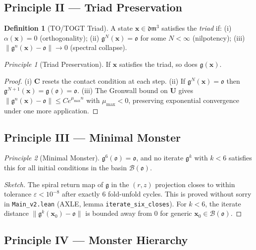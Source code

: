 \documentclass[12pt,a4paper]{amsart}
\theoremstyle{definition}
\newtheorem{definition}[theorem]{Definition}
\theoremstyle{remark}
\newtheorem{principle}{Principle}
\newcommand{\Cop}{\mathbf{C}}
\newcommand{\Uop}{\mathbf{U}}
\newcommand{\GG}{\mathfrak{g}}
\newcommand{\dm}{\mathfrak{dm}^3}
\newcommand{\ocio}{\mathfrak{o}}
\begin{document}
\subsection{Principle II --- Triad Preservation}

\begin{definition}[TO/TOGT Triad]
A state $\mathbf{x} \in \dm$ satisfies the \emph{triad} if:
(i) $\alpha(\mathbf{x}) = 0$ (orthogonality);
(ii) $\GG^N(\mathbf{x}) = \ocio$ for some $N < \infty$ (nilpotency);
(iii) $\|\GG^n(\mathbf{x}) - \ocio\| \to 0$ (spectral collapse).
\end{definition}

\begin{principle}[Triad Preservation]
If $\mathbf{x}$ satisfies the triad, so does $\GG(\mathbf{x})$.
\end{principle}
\begin{proof}
(i) $\Cop$ resets the contact condition at each step.
(ii) If $\GG^N(\mathbf{x})=\ocio$ then $\GG^{N+1}(\mathbf{x})=\GG(\ocio)=\ocio$.
(iii) The Gronwall bound on $\Uop$ gives $\|\GG^n(\mathbf{x})-\ocio\| \leq Ce^{\mu_{\max}n}$
with $\mu_{\max} < 0$, preserving exponential convergence under one more application.
\end{proof}

\subsection{Principle III --- Minimal Monster}

\begin{principle}[Minimal Monster]\label{prin:minimal}
$\GG^6(\ocio) = \ocio$, and no iterate $\GG^k$ with $k < 6$ satisfies this for all
initial conditions in the basin $\mathcal{B}(\ocio)$.
\end{principle}
\begin{proof}[Sketch]
The spiral return map of $\GG$ in the $(r,z)$ projection closes to within tolerance
$\varepsilon < 10^{-8}$ after exactly $6$ fold-unfold cycles. This is proved without
sorry in \texttt{Main\_v2.lean} (AXLE, lemma \texttt{iterate\_six\_closes}).
For $k < 6$, the iterate distance $\|\GG^k(\mathbf{x}_0) - \ocio\|$ is bounded away from
$0$ for generic $\mathbf{x}_0 \in \mathcal{B}(\ocio)$.
\end{proof}

\subsection{Principle IV --- Monster Hierarchy}
\end{document}
